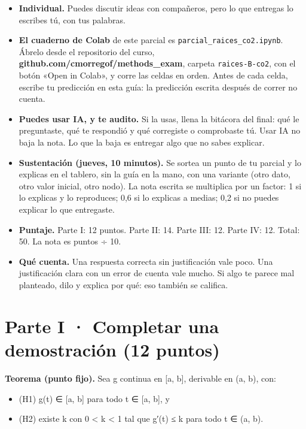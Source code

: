 \begin{itemize}
\tightlist
\item
  \textbf{Individual.} Puedes discutir ideas con compañeros, pero lo que entregas lo escribes tú, con tus palabras.
\item
  \textbf{El cuaderno de Colab} de este parcial es \texttt{parcial\_raices\_co2.ipynb}. Ábrelo desde el repositorio del curso, \textbf{github.com/cmorregof/methods\_exam}, carpeta \texttt{raices-B-co2}, con el botón «Open in Colab», y corre las celdas en orden. Antes de cada celda, escribe tu predicción en esta guía: la predicción escrita después de correr no cuenta.
\item
  \textbf{Puedes usar IA, y te audito.} Si la usas, llena la bitácora del final: qué le preguntaste, qué te respondió y qué corregiste o comprobaste tú. Usar IA no baja la nota. Lo que la baja es entregar algo que no sabes explicar.
\item
  \textbf{Sustentación (jueves, 10 minutos).} Se sortea un punto de tu parcial y lo explicas en el tablero, sin la guía en la mano, con una variante (otro dato, otro valor inicial, otro nodo). La nota escrita se multiplica por un factor: 1 si lo explicas y lo reproduces; 0,6 si lo explicas a medias; 0,2 si no puedes explicar lo que entregaste.
\item
  \textbf{Puntaje.} Parte I: 12 puntos. Parte II: 14. Parte III: 12. Parte IV: 12. Total: 50. La nota es puntos ÷ 10.
\item
  \textbf{Qué cuenta.} Una respuesta correcta sin justificación vale poco. Una justificación clara con un error de cuenta vale mucho. Si algo te parece mal planteado, dilo y explica por qué: eso también se califica.
\end{itemize}

\section{Parte I · Completar una demostración (12 puntos)}

\textbf{Teorema (punto fijo).} Sea g continua en {[}a, b{]}, derivable en (a, b), con:

\begin{itemize}
\tightlist
\item
  (H1) g(t) ∈ {[}a, b{]} para todo t ∈ {[}a, b{]}, y
\item
  (H2) existe k con 0 \textless{} k \textless{} 1 tal que \textbar g′(t)\textbar{} ≤ k para todo t ∈ (a, b).
\end{itemize}

